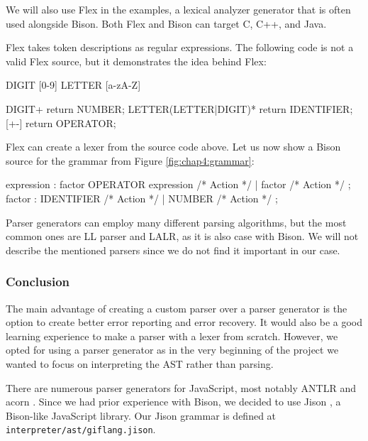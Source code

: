 We will also use Flex in the examples, a lexical analyzer generator that is often used alongside Bison. Both Flex and Bison can target C, C++, and Java.

Flex takes token descriptions as regular expressions. The following code is not a valid Flex source, but it demonstrates the idea behind Flex:
\begin{code}

DIGIT           [0-9]
LETTER          [a-zA-Z]

{DIGIT}+                        return NUMBER;
{LETTER}({LETTER}|{DIGIT})*     return IDENTIFIER;
[+-]                            return OPERATOR;
\end{code}

Flex can create a lexer from the source code above. Let us now show a Bison source for the grammar from Figure \ref{fig:chap4:grammar}:
\begin{code}


expression
    : factor OPERATOR expression    { /* Action */ }
    | factor                        { /* Action */ }
    ;
factor
    : IDENTIFIER                    { /* Action */ }
    | NUMBER                        { /* Action */ }
    ;
\end{code}

Parser generators can employ many different parsing algorithms, but the most common ones are LL parser and LALR, as it is also case with Bison. We will not describe
the mentioned parsers since we do not find it important in our case.

\subsubsection*{Conclusion}
The main advantage of creating a custom parser over a parser generator is the option to create better error reporting and error recovery. It would also be a
good learning experience to make a parser with a lexer from scratch. However, we opted for using a parser generator as in the very beginning of the project
we wanted to focus on interpreting the AST rather than parsing.

There are numerous parser generators for JavaScript, most notably ANTLR \cite{ANTLR} and acorn \cite{acorn}. Since we had prior experience with Bison, we
decided to use Jison \cite{Jison}, a Bison-like JavaScript library. Our Jison grammar is defined at \texttt{interpreter/ast/giflang.jison}.

